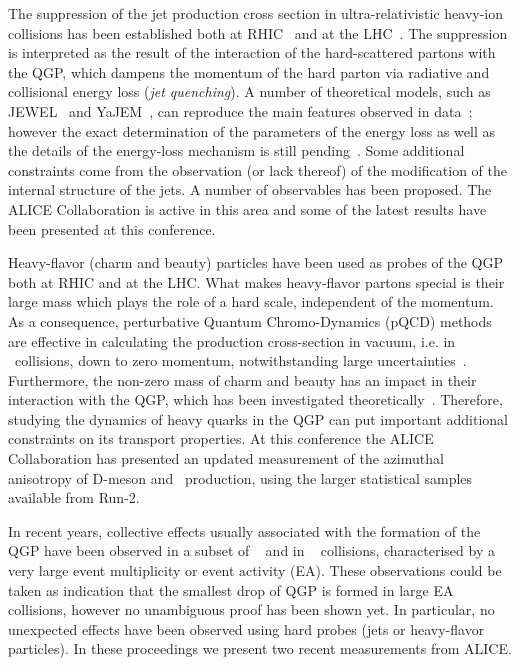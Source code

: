 \documentclass[10pt]{article}
\begin{document}
The suppression of the jet production cross section in ultra-relativistic heavy-ion collisions has been established both at RHIC~\cite{STAR:2017a} and at the LHC~\cite{ALICE:2015a}. The suppression is interpreted as the result of the interaction of the hard-scattered partons 
with the QGP, which dampens the momentum of the hard parton via radiative and collisional energy loss (\emph{jet quenching}). A number of theoretical models, such as JEWEL~\cite{Zapp:2014} and YaJEM~\cite{Renk:2013}, can reproduce
the main features observed in data~\cite{ALICE:2015a}; however the exact determination of the parameters of the energy loss as well as the details of the energy-loss mechanism is still pending~\cite{Burke:2013}. Some additional constraints come from the observation (or lack thereof) of
the modification of the internal structure of the jets. A number of observables has been proposed. The ALICE Collaboration is active in this area and some of the latest results have been presented at this conference.

Heavy-flavor (charm and beauty) particles have been used as probes of the QGP both at RHIC and at the LHC. What makes heavy-flavor partons special is their large mass which plays the role of a hard scale, 
independent of the momentum.
As a consequence, perturbative Quantum Chromo-Dynamics (pQCD) methods are effective in calculating the production cross-section in vacuum, i.e. in \pp\ collisions, down to zero momentum, notwithstanding large uncertainties~\cite{ALICE:2017a}.
Furthermore, the non-zero mass of charm and beauty has an impact in their interaction with the QGP, which has been investigated theoretically~\cite{Dokshitzer:2001}.
Therefore, studying the dynamics of heavy quarks in the QGP can put important additional constraints on its transport properties.
At this conference the ALICE Collaboration has presented an updated measurement of the azimuthal anisotropy of D-meson and \jpsi\ production, using the larger statistical samples available from Run-2.

In recent years, collective effects usually associated with the formation of the QGP have been observed in a subset of \pPb~\cite{CMS:2013b} and in \pp~\cite{ALICE:2017b} collisions, characterised by a very large event multiplicity or event activity (EA). These observations could be taken as indication that the smallest drop
of QGP is formed in large EA collisions, however no unambiguous proof has been shown yet. In particular, no unexpected effects have been observed using hard probes (jets or heavy-flavor particles). In these proceedings we present two recent measurements from ALICE.
\end{document}
